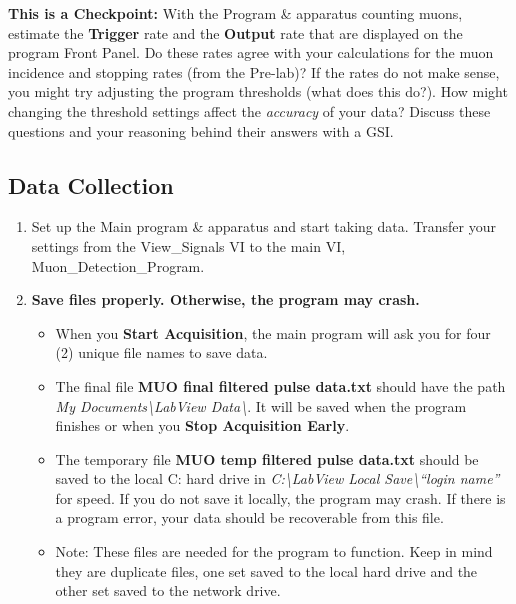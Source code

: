 \documentclass{../lab}
\begin{document}
\begin{enumerate}
    \textbf{This is a Checkpoint:} With the Program \& apparatus counting muons, estimate the \textbf{Trigger} rate and the \textbf{Output} rate that are displayed on the program Front Panel. Do these rates agree with your calculations for the muon incidence and stopping rates (from the Pre-lab)? If the rates do not make sense, you might try adjusting the program thresholds (what does this do?). How might changing the threshold settings affect the \emph{accuracy} of your data? Discuss these questions and your reasoning behind their answers with a GSI.

\end{enumerate}

\subsection{Data Collection}

\begin{enumerate}
    \item Set up the Main program \& apparatus and start taking data. Transfer your settings from the View\_Signals VI to the main VI, Muon\_Detection\_Program.

    \item \textbf{Save files properly. Otherwise, the program may crash.}

    \begin{itemize}
        \item When you \textbf{Start Acquisition}, the main program will ask you for four (2) unique file names to save data.

        \item The final file \textbf{MUO final filtered pulse data.txt} should have the path \emph{My Documents\textbackslash LabView Data\textbackslash}. It will be saved when the program finishes or when you \textbf{Stop Acquisition Early}.

        \item The temporary file \textbf{MUO temp filtered pulse data.txt} should be saved to the local C: hard drive in \emph{C:\textbackslash LabView Local Save\textbackslash``login name''} for speed. If you do not save it locally, the program may crash. If there is a program error, your data should be recoverable from this file.

        \item Note: These files are needed for the program to function. Keep in mind they are duplicate files, one set saved to the local hard drive and the other set saved to the network drive.

    \end{itemize}

\end{enumerate}
\end{document}
